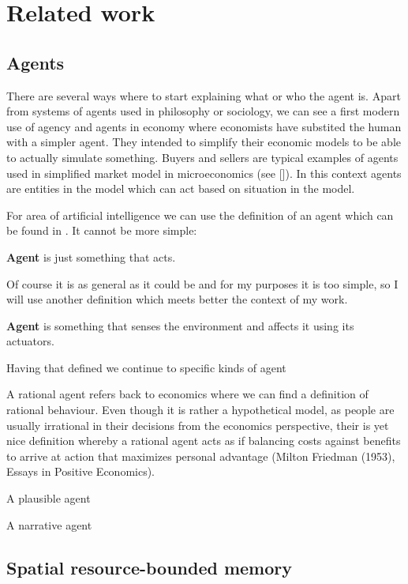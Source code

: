 \chapter{Related work}

\section{Agents}

There are several ways where to start explaining what or who the agent is. Apart from systems of agents used in philosophy or sociology, we can see a first modern use of agency and agents in economy where economists have substited the human with a simpler agent. They intended to simplify their economic models to be able to actually simulate something. Buyers and sellers are typical examples of agents used in simplified market model in microeconomics (see []). In this context agents are entities in the model which can act based on situation in the model.

For area of artificial intelligence we can use the definition of an agent which can be found in \cite{russel2003ai}. It cannot be more simple:

\begin{definition}{\bf Agent} is just something that acts.
\end{definition} 

Of course it is as general as it could be and for my purposes it is too simple, so I will use another definition which meets better the context of my work.

\begin{definition}{\bf Agent} is something that senses the environment and affects it using its actuators.
\end{definition} 

Having that defined we continue to specific kinds of agent

A rational agent refers back to economics where we can find a definition of rational behaviour. Even though it is rather a hypothetical model, as people are usually irrational in their decisions from the economics perspective, their is yet nice definition whereby a rational agent acts as if balancing costs against benefits to arrive at action that maximizes personal advantage (Milton Friedman (1953), Essays in Positive Economics).

A plausible agent
 
A narrative agent



\section{Spatial resource-bounded memory}

\cite{Ho:memoryarchitectures}